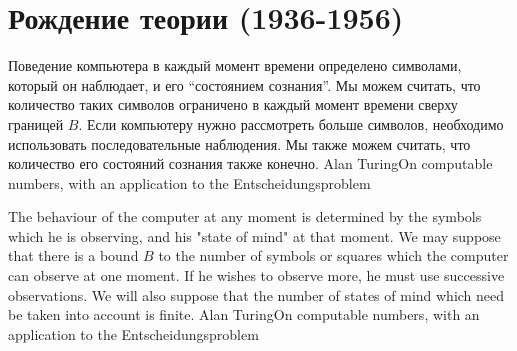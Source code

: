 \documentclass[24pt,pdf,hyperref={unicode}]{beamer}
\begin{document}
\section{Рождение теории (1936-1956)}

\begin{frame}
\end{frame}

\begin{frame}
\end{frame}

 

\begin{frame}
\citate
{
Поведение компьютера в каждый момент времени определено символами, который он наблюдает, и его ``состоянием сознания''. 
Мы можем считать, что количество таких символов ограничено в каждый момент времени сверху границей $B$. Если компьютеру нужно рассмотреть 
больше символов, необходимо использовать последовательные наблюдения. Мы также можем считать, что количество его состояний сознания также конечно.
}{Alan Turing}{On computable numbers, with an application to the Entscheidungsproblem}
\end{frame}

\begin{frame}
\citate
{
The behaviour of the computer at any moment is determined by the symbols which \alert<2->{he} is observing, and \alert<2->{his "state of mind"} at that moment. We may suppose that there is a bound $B$ to the number of symbols or squares which the computer can observe at one moment. If \alert<2->{he wishes} to observe more, he must use successive observations. We will also suppose that the number of \alert<2->{states of mind} which need be taken into account is finite.
}{Alan Turing}{On computable numbers, with an application to the Entscheidungsproblem}
\end{frame}
\end{document}
